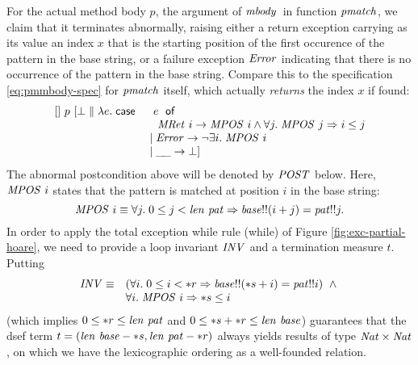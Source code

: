 For the actual method body $p$, \IE the argument of $\mathit{mbody}\,$ in function
$\mathit{pmatch}$, we claim that it terminates abnormally, raising either a return
exception carrying as its value an index $x$ that is the starting position of
the first occurence of the pattern in the base string, or a failure exception
$\mathit{Error}$ indicating that there is no occurrence of the pattern in the base
string. Compare this to the specification \eqref{eq:pmmbody-spec} for
$\mathit{pmatch}$ itself, which actually \emph{returns} the index $x$ if found:
\begin{equation}
\label{eq:pmatchspec}
\begin{array}{ll}
[]~ p~ [\bot \parallel \lambda e.\; \mathsf{case}\;&\ e\ \;\mathsf{of}\; \\
 & \hspace{0.7em}\mathit{MRet}\ i \to \mathit{MPOS}\ i \land
    \forall j.\; \mathit{MPOS}\ j\Rightarrow i\leq j\\
 &  \mid \mathit{Error} \to \lnot \exists i.\; \mathit{MPOS}\ i\\
 &  \mid \_\!\_ \to \bot]
\end{array}
\end{equation}
The abnormal postcondition above will be denoted by $\mathit{POST}$ below. Here,
$\mathit{MPOS}\ i$ states that the pattern is matched at position $i$ in the
base string:
\begin{equation*}
\mathit{MPOS}\ i \equiv \forall j.\; 0 \leq j < \mathit{len}~\mathit{pat} \Rightarrow
\mathit{base}!!(i+j) = \mathit{pat}!!j.
\end{equation*}
In order to apply the total exception while rule (while) of Figure
\ref{fig:exc-partial-hoare}, we need to provide a loop invariant $\mathit{INV}$ and
a termination measure $t$.  Putting
\begin{equation*}
\begin{array}{ll}
\mathit{INV} \equiv 
      & (\forall i.\; 0 \leq i < {\ast r} \Rightarrow 
       \mathit{base}!!({\ast s}+i) = \mathit{pat}!!i)\ \land {}\\
      & \forall i.\; \mathit{MPOS}\ i \Rightarrow {\ast s} \leq i 
\end{array}
\end{equation*}
(which implies $0 \leq {\ast r} \leq \mathit{len}~\mathit{pat}$ and $0\leq
{\ast s} + {\ast r} \leq \mathit{len}~\mathit{base}$) guarantees that the
dsef term \(t = (\mathit{len}~\mathit{base} - {\ast s},
\mathit{len}~\mathit{pat} - {\ast r})\) always yields results of type
$\mathit{Nat} \times \mathit{Nat}$, on which we have the lexicographic ordering
as a well-founded relation.


